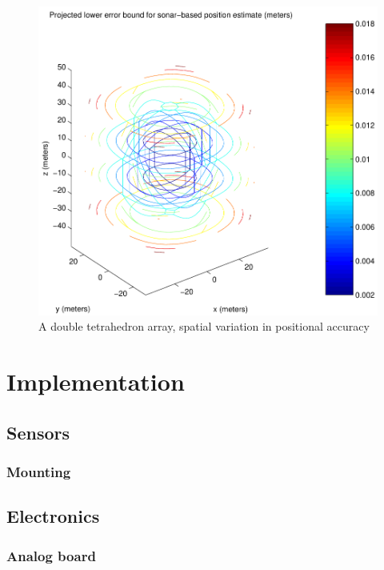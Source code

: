 \documentclass[10pt]{article}
\begin{document}
\begin{figure}[htbp]
\begin{center}
\includegraphics[scale=0.5]{doubleTetrahedron.pdf}
\caption{A double tetrahedron array, spatial variation in positional accuracy}
\label{fig:doubleTetrahedron}
\end{center}
\end{figure}

\section{Implementation}

\subsection{Sensors}

\subsubsection{Mounting}

\subsection{Electronics}

\subsubsection{Analog board}
\end{document}
